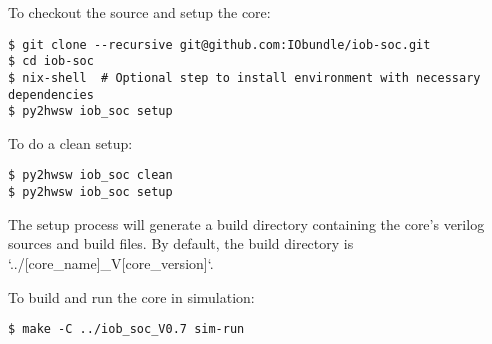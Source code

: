 %

To checkout the source and setup the core:

\begin{verbatim}
$ git clone --recursive git@github.com:IObundle/iob-soc.git
$ cd iob-soc
$ nix-shell  # Optional step to install environment with necessary dependencies
$ py2hwsw iob_soc setup
\end{verbatim}

To do a clean setup:

\begin{verbatim}
$ py2hwsw iob_soc clean
$ py2hwsw iob_soc setup
\end{verbatim}

The setup process will generate a build directory containing the core's verilog sources and build files.
By default, the build directory is `../[core\_name]\_V[core\_version]`.

To build and run the core in simulation:
\begin{verbatim}
$ make -C ../iob_soc_V0.7 sim-run
\end{verbatim}
